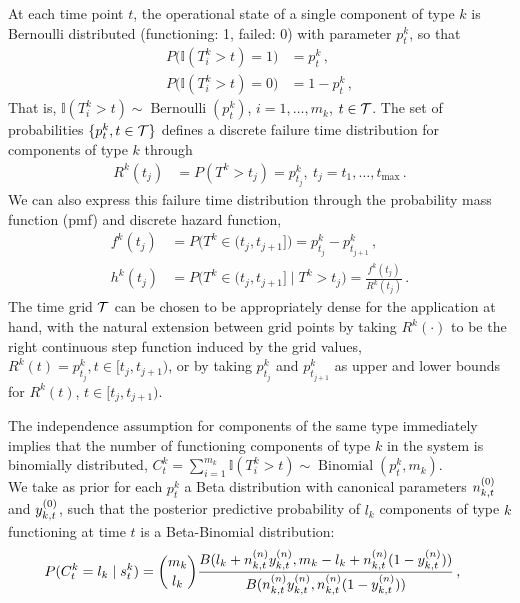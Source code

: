 \documentclass[12pt, a4paper]{elsarticle}
\newcommand{\indic}{\mathbb{I}}
\newcommand{\ber}{\operatorname{Bernoulli}}
\newcommand{\bin}{\operatorname{Binomial}}
\def\tmax{t_\text{max}}
\newcommand{\ptk}{p^k_t}
\begin{document}
At each time point $t$, the operational state of a single component of type $k$
is Bernoulli distributed (functioning: 1, failed: 0) with parameter $\ptk$, so that
\begin{align*}
P\big(\indic(T^k_i > t) = 1\big) &= \ptk\,, \\
P\big(\indic(T^k_i > t) = 0\big) &= 1 - \ptk\,,
\end{align*}
That is, $\indic(T^k_i > t) \sim \ber(\ptk)$, $i = 1, \ldots, m_k$, $t \in {\cal T}$.
The set of probabilities $\{ \ptk, t \in {\cal T}\}$
defines a discrete failure time distribution for components of type $k$ through
\begin{align*}
R^k(t_j) &= P(T^k > t_j) = p^k_{t_j},\ t_j = t_1, \ldots, \tmax\,.
\end{align*}
We can also express this failure time distribution through the probability mass function (pmf) and discrete hazard function,
\begin{align*}
f^k(t_j) &= P\big(T^k \in (t_j,t_{j+1}]\big) = p^k_{t_j} - p^k_{t_{j+1}}\,,\\ 
h^k(t_j) &= P\big(T^k \in (t_j,t_{j+1}]\mid T^k > t_j\big) = \frac{f^k(t_j)}{R^k(t_j)}\,. %
\end{align*}
The time grid $\cal T$ can be chosen to be appropriately dense for the application at hand,
with the natural extension between grid points by taking $R^k(\cdot)$ to be the right continuous step function induced by the grid values,
$R^k(t) = p^k_{t_j}, t \in [t_j, t_{j+1})$,
or by taking $p^k_{t_j}$ and $p^k_{t_{j+1}}$ as upper and lower bounds for $R^k(t)$, $t \in [t_j, t_{j+1})$.

The independence assumption for components of the same type immediately implies that 
the number of functioning components of type $k$ in the system
is binomially distributed, $C^k_t = \sum_{i=1}^{m_k} \indic(T^k_i > t) \sim \bin(\ptk, m_k)$.\\



We take as prior for each $\ptk$ a Beta distribution with canonical parameters $n^{(0)}_{k,t}$ and $y^{(0)}_{k,t}$,
such that the posterior predictive probability of $l_k$ components of type $k$ functioning at time $t$
is a Beta-Binomial distribution:
\begin{align}
P(C^k_t = l_k \mid s^k_t) &= {m_k \choose l_k} \frac{B(l_k + n^{(n)}_{k,t}y^{(n)}_{k,t}, m_k - l_k + n^{(n)}_{k,t}(1-y^{(n)}_{k,t}))}
                                                    {B(n^{(n)}_{k,t}y^{(n)}_{k,t}, n^{(n)}_{k,t}(1-y^{(n)}_{k,t}))} \,,
\label{eq:postpredCny}
\end{align}
\end{document}
